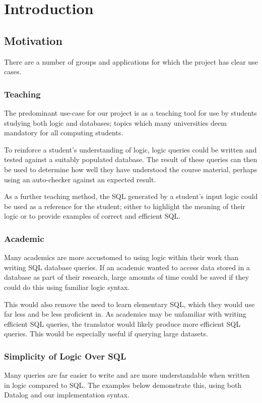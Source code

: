 \documentclass[a4paper, 11pt]{article}
\begin{document}
\section{Introduction}
  \subsection{Motivation}
    There are a number of groups and applications for which the project has
    clear use cases.

    \subsubsection{Teaching}
      The predominant use-case for our project is as a teaching tool for use by
      students studying both logic and databases; topics which many universities
      deem mandatory for all computing students.

      To reinforce a student's understanding of logic, logic queries could be
      written and tested against a suitably populated database. The result of
      these queries can then be used to determine how well they have understood
      the course material, perhaps using an auto-checker against an expected
      result.

      As a further teaching method, the SQL generated by a student's input logic
      could be used as a reference for the student; either to highlight the
      meaning of their logic or to provide examples of correct and efficient
      SQL.

    \subsubsection{Academic}
      Many academics are more accustomed to using logic within their work than
      writing SQL database queries. If an academic wanted to access data stored
      in a database as part of their research, large amounts of time could be
      saved if they could do this using familiar logic syntax.

      This would also remove the need to learn elementary SQL, which they would
      use far less and be less proficient in. As academics may be unfamiliar
      with writing efficient SQL queries, the translator would likely produce
      more efficient SQL queries. This would be especially useful if querying
      large datasets.

    \subsubsection{Simplicity of Logic Over SQL}
      Many queries are far easier to write and are more understandable when
      written in logic compared to SQL. The examples below demonstrate this,
      using both Datalog and our implementation syntax.
\end{document}
